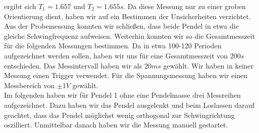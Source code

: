 ergibt sich $T_1 = 1.657$ und $T_2=1.655s$. Da diese Messung nur zu einer groben Orientierung dient, haben wir auf ein Bestimmen der Unsicherheiten verzichtet. Aus der Probemessung konnten wir schließen, dass beide Pendel in etwa die gleiche Schwingfrequenz aufweisen. Weiterhin konnten wir so die Gesamtmesszeit für die folgenden Messungen bestimmen. Da in etwa 100-120 Perioden aufgezeichnet werden sollen, haben wir uns für eine Gesamtmesszeit von $200s$ entschieden. Das Messintervall haben wir als $20ms$ gewählt. Wir haben in keiner Messung einen Trigger verwendet. Für die Spannungsmessung haben wir einen Messbereich von $\pm 1V$ gewählt. \\
Im folgenden haben wir für Pendel 1 ohne eine Pendelmasse drei Messreihen aufgezeichnet. Dazu haben wir das Pendel ausgelenkt und beim Loslassen darauf geachtet, dass das Pendel möglichst wenig orthogonal zur Schwingrichtung oszilliert. Unmittelbar danach haben wir die Messung manuell gestartet.\\

